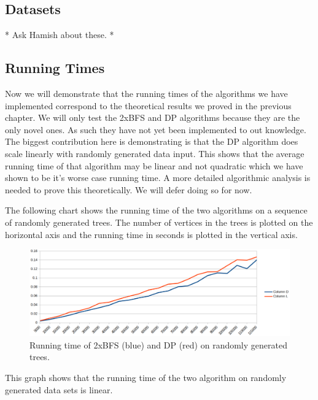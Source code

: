 \subsection{Datasets}

* Ask Hamish about these. *


\subsection{Running Times}


Now we will demonstrate that the running times of the algorithms we have implemented correspond to the theoretical results we proved in the previous chapter. We will only test the 2xBFS and DP algorithms because they are the only novel ones. As such they have not yet been implemented to out knowledge. The biggest contribution here is demonstrating is that the DP algorithm does scale linearly with randomly generated data input. This shows that the average running time of that algorithm may be linear and not quadratic which we have shown to be it's worse case running time. A more detailed algorithmic analysis is needed to prove this theoretically. We will defer doing so for now.

The following chart shows the running time of the two algorithms on a sequence of randomly generated trees. The number of vertices in the trees is plotted on the horizontal axis and the running time in seconds is plotted in the vertical axis.


\begin{figure}%
    \centering
    \includegraphics[center, scale=0.7 ]{./images/running-time.eps}
    \caption{Running time of 2xBFS (blue) and DP (red) on randomly generated trees. }%
    \label{fig:case1.1}%
\end{figure}

This graph shows that the running time of the two algorithm on randomly generated data sets is linear. 

